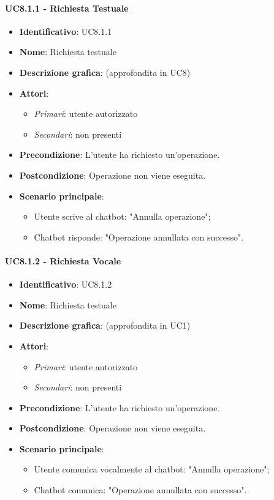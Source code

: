 \paragraph{UC8.1.1 - Richiesta Testuale}
\begin{itemize}
   \item \textbf{Identificativo}: UC8.1.1
   \item \textbf{Nome}: Richiesta testuale
   \item \textbf{Descrizione grafica}: (approfondita in UC8)
   \item \textbf{Attori}:
   \begin{itemize} 
       \item \textit{Primari}: utente autorizzato
       \item \textit{Secondari}: non presenti
   \end{itemize}
       \item \textbf{Precondizione}: L'utente ha richiesto un'operazione.
       \item \textbf{Postcondizione}: Operazione non viene eseguita. 
    \item \textbf{Scenario principale}: 
       \begin{itemize}
        \item Utente scrive al chatbot: "Annulla operazione";
        \item Chatbot risponde: "Operazione annullata con successo".
       \end{itemize}
\end{itemize}

\paragraph{UC8.1.2 - Richiesta Vocale}
\begin{itemize}
   \item \textbf{Identificativo}: UC8.1.2
   \item \textbf{Nome}: Richiesta testuale
   \item \textbf{Descrizione grafica}: (approfondita in UC1)
   \item \textbf{Attori}:
   \begin{itemize} 
       \item \textit{Primari}: utente autorizzato
       \item \textit{Secondari}: non presenti
   \end{itemize}
       \item \textbf{Precondizione}: L'utente ha richiesto un'operazione.
       \item \textbf{Postcondizione}: Operazione non viene eseguita. 
    \item \textbf{Scenario principale}: 
       \begin{itemize}
        \item Utente comunica vocalmente al chatbot: "Annulla operazione";
        \item Chatbot comunica: "Operazione annullata con successo".
       \end{itemize}
\end{itemize}

